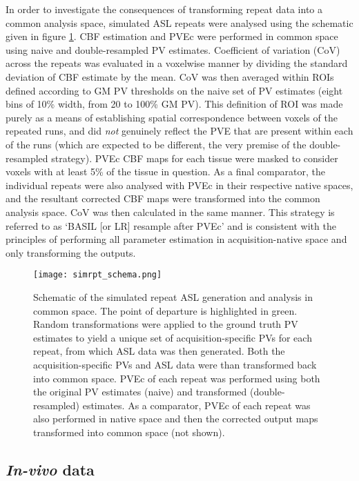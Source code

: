 In order to investigate the consequences of transforming repeat data into a common analysis space, simulated ASL repeats were analysed using the schematic given in figure \ref{simrpt_schema}. CBF estimation and PVEc were performed in common space using naive and double-resampled PV estimates. Coefficient of variation (CoV) across the repeats was evaluated in a voxelwise manner by dividing the standard deviation of CBF estimate by the mean. CoV was then averaged within ROIs defined according to GM PV thresholds on the naive set of PV estimates (eight bins of 10\% width, from 20 to 100\% GM PV). This definition of ROI was made purely as a means of establishing spatial correspondence between voxels of the repeated runs, and did \textit{not} genuinely reflect the PVE that are present within each of the runs (which are expected to be different, the very premise of the double-resampled strategy). PVEc CBF maps for each tissue were masked to consider voxels with at least 5\% of the tissue in question. As a final comparator, the individual repeats were also analysed with PVEc in their respective native spaces, and the resultant corrected CBF maps were transformed into the common analysis space. CoV was then calculated in the same manner. This strategy is referred to as `BASIL [or LR] resample after PVEc' and is consistent with the principles of performing all parameter estimation in acquisition-native space and only transforming the outputs.

\begin{figure}[h]
\centering
\texttt{[image: simrpt\_schema.png]}
\caption{Schematic of the simulated repeat ASL generation and analysis in common space. The point of departure is highlighted in green. Random transformations were applied to the ground truth PV estimates to yield a unique set of acquisition-specific PVs for each repeat, from which ASL data was then generated. Both the acquisition-specific PVs and ASL data were than transformed back into common space. PVEc of each repeat was performed using both the original PV estimates (naive) and transformed (double-resampled) estimates. As a comparator, PVEc of each repeat was also performed in native space and then the corrected output maps transformed into common space (not shown).}
\label{simrpt_schema}
\end{figure}

\subsection{\textit{In-vivo} data}

